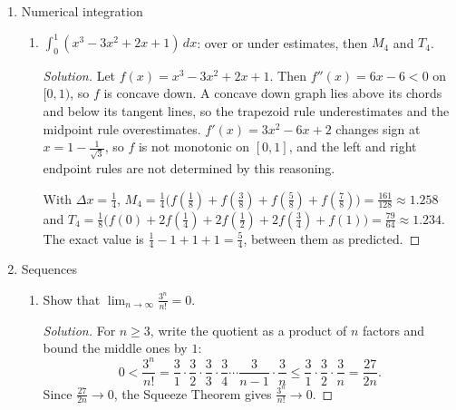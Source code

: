 \documentclass[12pt]{article}
\newenvironment{solution}
  {\renewcommand\qedsymbol{$\blacksquare$}\begin{proof}[Solution]}
  {\end{proof}}
\begin{document}
\begin{enumerate}
\begin{enumerate}
\item[(d)] $\int_0^\infty\frac{e^x}{(1+e^x)^3}\,dx$
\begin{solution}
Let $u=1+e^x$, $du=e^x\,dx$. Then $x=0$ gives $u=2$ and $x\to\infty$ gives $u\to\infty$.
\[ \lim_{t\to\infty}\int_2^{t}u^{-3}\,du=\lim_{t\to\infty}\left(\frac{1}{2\cdot 4}-\frac{1}{2t^2}\right)=\frac18. \]
\end{solution}




\end{enumerate}

\setcounter{enumi}{13}
\item Numerical integration
\begin{enumerate}
\item[(a)] $\int_0^1(x^3-3x^2+2x+1)\,dx$: over or under estimates, then $M_4$ and $T_4$.
\begin{solution}
Let $f(x)=x^3-3x^2+2x+1$. Then $f''(x)=6x-6<0$ on $[0,1)$, so $f$ is concave down. A concave down graph lies above its chords and below its tangent lines, so the trapezoid rule underestimates and the midpoint rule overestimates. $f'(x)=3x^2-6x+2$ changes sign at $x=1-\frac{1}{\sqrt3}$, so $f$ is not monotonic on $[0,1]$, and the left and right endpoint rules are not determined by this reasoning.

With $\Delta x=\frac14$, $M_4=\frac14\bigl(f(\tfrac18)+f(\tfrac38)+f(\tfrac58)+f(\tfrac78)\bigr)=\frac{161}{128}\approx1.258$ and $T_4=\frac18\bigl(f(0)+2f(\tfrac14)+2f(\tfrac12)+2f(\tfrac34)+f(1)\bigr)=\frac{79}{64}\approx1.234$. The exact value is $\frac14-1+1+1=\frac54$, between them as predicted.
\end{solution}



\end{enumerate}

\setcounter{enumi}{14}
\item Sequences
\begin{enumerate}



\item[(d)] Show that $\lim_{n\to\infty}\frac{3^n}{n!}=0$.
\begin{solution}
For $n\ge3$, write the quotient as a product of $n$ factors and bound the middle ones by $1$:
\[ 0<\frac{3^n}{n!}=\frac31\cdot\frac32\cdot\frac33\cdot\frac34\cdots\frac{3}{n-1}\cdot\frac3n\le\frac31\cdot\frac32\cdot\frac3n=\frac{27}{2n}. \]
Since $\frac{27}{2n}\to0$, the Squeeze Theorem gives $\frac{3^n}{n!}\to0$.
\end{solution}


\end{enumerate}
\end{enumerate}
\end{document}
